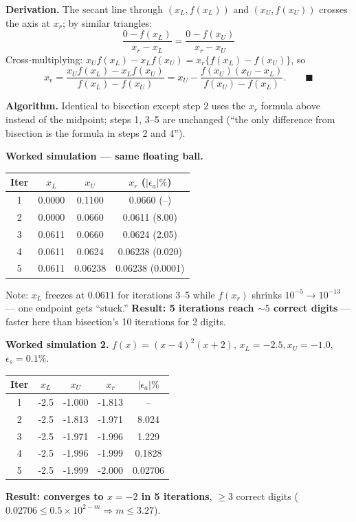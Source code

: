 \begin{examplebox}
\textbf{Derivation.} The secant line through $(x_L,f(x_L))$ and $(x_U,f(x_U))$ crosses the axis at $x_r$; by similar triangles:
\[
\frac{0-f(x_L)}{x_r-x_L} = \frac{0-f(x_U)}{x_r-x_U}
\]
Cross-multiplying: $x_Uf(x_L)-x_Lf(x_U) = x_r\{f(x_L)-f(x_U)\}$, so
\[
x_r = \frac{x_Uf(x_L)-x_Lf(x_U)}{f(x_L)-f(x_U)} = x_U - \frac{f(x_U)(x_U-x_L)}{f(x_U)-f(x_L)}. \qquad\blacksquare
\]
\end{examplebox}

\textbf{Algorithm.} Identical to bisection except step 2 uses the $x_r$ formula above instead of the midpoint; steps 1, 3–5 are unchanged (``the only difference from bisection is the formula in steps 2 and 4'').

\begin{examplebox}
\textbf{Worked simulation — same floating ball.}
\begin{center}\small
\begin{tabular}{@{}cccc@{}}
\toprule
Iter & $x_L$ & $x_U$ & $x_r$ ($|\epsilon_a|\%$)\\
\midrule
1 & 0.0000 & 0.1100 & 0.0660 (--)\\
2 & 0.0000 & 0.0660 & 0.0611 (8.00)\\
3 & 0.0611 & 0.0660 & 0.0624 (2.05)\\
4 & 0.0611 & 0.0624 & 0.06238 (0.020)\\
5 & 0.0611 & 0.06238 & 0.06238 (0.0001)\\
\bottomrule
\end{tabular}
\end{center}
Note: $x_L$ freezes at $0.0611$ for iterations 3--5 while $f(x_r)$ shrinks $10^{-5}\to10^{-13}$ — one endpoint gets ``stuck.'' \textbf{Result: 5 iterations reach $\sim5$ correct digits} — faster here than bisection's 10 iterations for 2 digits.
\end{examplebox}

\begin{examplebox}
\textbf{Worked simulation 2.} $f(x)=(x-4)^2(x+2)$, $x_L=-2.5,x_U=-1.0$, $\epsilon_s=0.1\%$.
\begin{center}\small
\begin{tabular}{@{}ccccc@{}}
\toprule
Iter & $x_L$ & $x_U$ & $x_r$ & $|\epsilon_a|\%$\\
\midrule
1 & -2.5 & -1.000 & -1.813 & --\\
2 & -2.5 & -1.813 & -1.971 & 8.024\\
3 & -2.5 & -1.971 & -1.996 & 1.229\\
4 & -2.5 & -1.996 & -1.999 & 0.1828\\
5 & -2.5 & -1.999 & -2.000 & 0.02706\\
\bottomrule
\end{tabular}
\end{center}
\textbf{Result: converges to $x=-2$ in 5 iterations}, $\ge3$ correct digits ($0.02706\le0.5\times10^{2-m}\Rightarrow m\le3.27$).
\end{examplebox}

